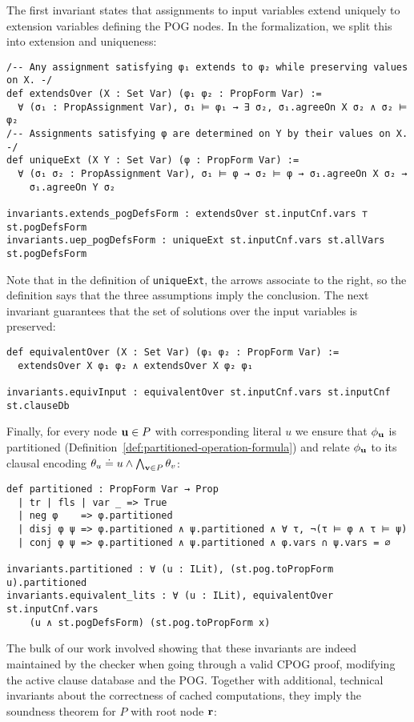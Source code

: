 The first invariant states that assignments to input variables
extend uniquely to extension variables defining the POG nodes.
In the formalization, we split this into extension and uniqueness:
\begin{lstlisting}
/-- Any assignment satisfying φ₁ extends to φ₂ while preserving values on X. -/
def extendsOver (X : Set Var) (φ₁ φ₂ : PropForm Var) :=
  ∀ (σ₁ : PropAssignment Var), σ₁ ⊨ φ₁ → ∃ σ₂, σ₁.agreeOn X σ₂ ∧ σ₂ ⊨ φ₂
/-- Assignments satisfying φ are determined on Y by their values on X. -/
def uniqueExt (X Y : Set Var) (φ : PropForm Var) :=
  ∀ (σ₁ σ₂ : PropAssignment Var), σ₁ ⊨ φ → σ₂ ⊨ φ → σ₁.agreeOn X σ₂ →
    σ₁.agreeOn Y σ₂

invariants.extends_pogDefsForm : extendsOver st.inputCnf.vars ⊤ st.pogDefsForm
invariants.uep_pogDefsForm : uniqueExt st.inputCnf.vars st.allVars st.pogDefsForm
\end{lstlisting}
Note that in the definition of \lstinline{uniqueExt}, the arrows associate to the right,
so the definition says that the three assumptions imply the conclusion.
The next invariant guarantees that the set of solutions over the input variables is preserved:
\begin{lstlisting}
def equivalentOver (X : Set Var) (φ₁ φ₂ : PropForm Var) :=
  extendsOver X φ₁ φ₂ ∧ extendsOver X φ₂ φ₁

invariants.equivInput : equivalentOver st.inputCnf.vars st.inputCnf st.clauseDb
\end{lstlisting}
Finally, for every node $\mathbf{u}\in P$ with corresponding literal $u$ we ensure that $\phi_{\mathbf{u}}$ is partitioned (Definition~\ref{def:partitioned-operation-formula}) and relate $\phi_{\mathbf{u}}$ to its clausal encoding $\theta_u \doteq u \wedge \bigwedge_{\mathbf{v}\in P}\theta_v$:
\begin{lstlisting}
def partitioned : PropForm Var → Prop
  | tr | fls | var _ => True
  | neg φ    => φ.partitioned
  | disj φ ψ => φ.partitioned ∧ ψ.partitioned ∧ ∀ τ, ¬(τ ⊨ φ ∧ τ ⊨ ψ)
  | conj φ ψ => φ.partitioned ∧ ψ.partitioned ∧ φ.vars ∩ ψ.vars = ∅

invariants.partitioned : ∀ (u : ILit), (st.pog.toPropForm u).partitioned
invariants.equivalent_lits : ∀ (u : ILit), equivalentOver st.inputCnf.vars
    (u ∧ st.pogDefsForm) (st.pog.toPropForm x)
\end{lstlisting}

The bulk of our work involved showing
that these invariants are indeed maintained by the checker
when going through a valid CPOG proof,
modifying the active clause database and the POG.
Together with additional, technical invariants
about the correctness of cached computations,
they imply the soundness theorem for $P$ with root node $\mathbf{r}$:

